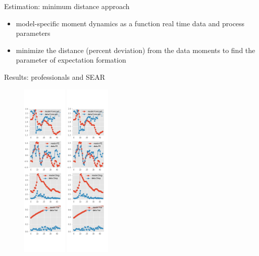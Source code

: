 \documentclass{beamer}
\begin{document}
\begin{frame}{Estimation: minimum distance approach}
	\begin{itemize}
\item model-specific moment dynamics as a function real time data and process parameters 
\item minimize the distance (percent deviation) from the data moments to find the parameter of expectation formation	
	\end{itemize}
\end{frame}

\begin{frame}{Results: professionals and SEAR}
\begin{figure}[ht]
	\centering
    \label{SE_diag_SPF}
		\includegraphics[width=0.19\textwidth, height = \0.95\textheight]{figures/spf_se_est_diag0.png}
		\includegraphics[width=0.19\textwidth, height = \0.95\textheight]{figures/spf_se_est_diag1.png}

\end{figure}
\end{frame}
\end{document}
